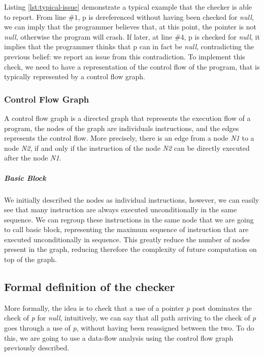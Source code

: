 

Listing \ref{lst:typical-issue} demonstrate a typical example that the checker is able to report. 
From line $\#1$, p is dereferenced without having been checked for \emph{null}, we can imply that the programmer believes that, at this point, the pointer is not \emph{null}, otherwise the program will crash. 
If later, at line $\#4$, p is checked for \emph{null}, it implies that the programmer thinks that p can in fact be \emph{null}, contradicting the previous belief: we report an issue from this contradiction.
To implement this check, we need to have a representation of the control flow of the program, that is typically represented by a control flow graph.

\subsubsection{Control Flow Graph}
\label{subsubsec:control_flow_graph}

A control flow graph is a directed graph that represents the execution flow of a program, the nodes of the graph are individuals instructions, and the edges represents the control flow. More precisely, there is an edge from a node \emph{N1} to a node \emph{N2}, if and only if the instruction of the node \emph{N2} can be directly executed after the node \emph{N1}.


\subparagraph{Basic Block}
We initially described the nodes as individual instructions, however, we can easily see that many instruction are always executed unconditionally in the same sequence.
We can regroup these instructions in the same node that we are going to call basic block, representing the maximum sequence of instruction that are executed unconditionally in sequence. 
This greatly reduce the number of nodes present in the graph, reducing therefore the complexity of future computation on top of the graph.

\subsection{Formal definition of the checker}
\label{subsec:checker_formal_definition}
More formally, the idea is to check that a use of a pointer \emph{p} post dominates the check of \emph{p} for \emph{null}, intuitively, we can say that all path arriving to the check of \emph{p} goes through a use of \emph{p}, without having been reassigned between the two. 
To do this, we are going to use a data-flow analysis using the control flow graph previously described.


